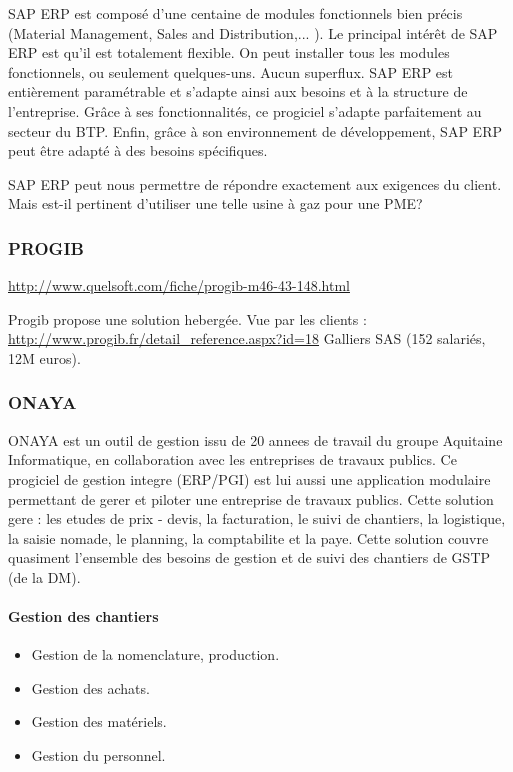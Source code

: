 				SAP ERP est composé d'une centaine de modules fonctionnels bien précis (Material Management, Sales and Distribution,... ). 
Le principal intérêt de SAP ERP est qu'il est totalement flexible. On peut installer tous les modules fonctionnels, ou seulement quelques-uns. 
Aucun superflux. SAP ERP est entièrement paramétrable et s'adapte ainsi aux besoins et à la structure de l'entreprise. 
Grâce à ses fonctionnalités, ce progiciel s'adapte parfaitement au secteur du BTP. 
Enfin, grâce à son environnement de développement, SAP ERP peut être adapté à des besoins spécifiques.

SAP ERP peut nous permettre de répondre exactement aux exigences du client. Mais est-il pertinent d'utiliser une telle usine à gaz pour une PME?  

		\subsubsection{PROGIB}
				\url{http://www.quelsoft.com/fiche/progib-m46-43-148.html}
				 
				Progib propose une solution hebergée.
				Vue par les clients :
				\url{http://www.progib.fr/detail_reference.aspx?id=18}
				Galliers SAS (152 salariés, 12M euros).

		\subsubsection{ONAYA}
		ONAYA est un outil de gestion issu de 20 annees de travail du groupe Aquitaine Informatique, en collaboration avec les entreprises de travaux publics. Ce progiciel de gestion integre (ERP/PGI) est lui aussi une application modulaire permettant de gerer et piloter une entreprise de travaux publics. Cette solution gere : les etudes de prix - devis, la facturation, le suivi de chantiers, la
logistique, la saisie nomade, le planning, la comptabilite et la paye. Cette solution couvre quasiment l'ensemble des besoins de gestion et de suivi des chantiers de GSTP (de la DM).

				\paragraph{Gestion des chantiers}
				\newline
				\begin{itemize}
				    \item Gestion de la nomenclature, production.
				    \item Gestion des achats.
				    \item Gestion des matériels.
				    \item Gestion du personnel.
				\end{itemize}
				
